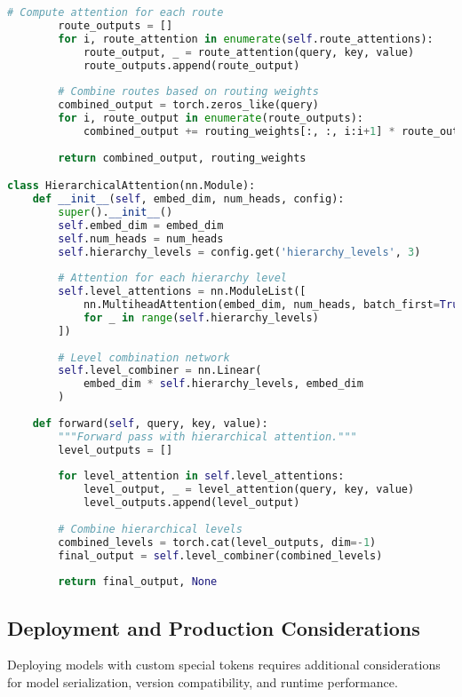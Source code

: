 \begin{lstlisting}[language=Python, caption=Custom attention mechanisms for special tokens]
        # Compute attention for each route
        route_outputs = []
        for i, route_attention in enumerate(self.route_attentions):
            route_output, _ = route_attention(query, key, value)
            route_outputs.append(route_output)
        
        # Combine routes based on routing weights
        combined_output = torch.zeros_like(query)
        for i, route_output in enumerate(route_outputs):
            combined_output += routing_weights[:, :, i:i+1] * route_output
        
        return combined_output, routing_weights

class HierarchicalAttention(nn.Module):
    def __init__(self, embed_dim, num_heads, config):
        super().__init__()
        self.embed_dim = embed_dim
        self.num_heads = num_heads
        self.hierarchy_levels = config.get('hierarchy_levels', 3)
        
        # Attention for each hierarchy level
        self.level_attentions = nn.ModuleList([
            nn.MultiheadAttention(embed_dim, num_heads, batch_first=True)
            for _ in range(self.hierarchy_levels)
        ])
        
        # Level combination network
        self.level_combiner = nn.Linear(
            embed_dim * self.hierarchy_levels, embed_dim
        )
    
    def forward(self, query, key, value):
        """Forward pass with hierarchical attention."""
        level_outputs = []
        
        for level_attention in self.level_attentions:
            level_output, _ = level_attention(query, key, value)
            level_outputs.append(level_output)
        
        # Combine hierarchical levels
        combined_levels = torch.cat(level_outputs, dim=-1)
        final_output = self.level_combiner(combined_levels)
        
        return final_output, None
\end{lstlisting}

\subsection{Deployment and Production Considerations}

Deploying models with custom special tokens requires additional considerations for model serialization, version compatibility, and runtime performance.

